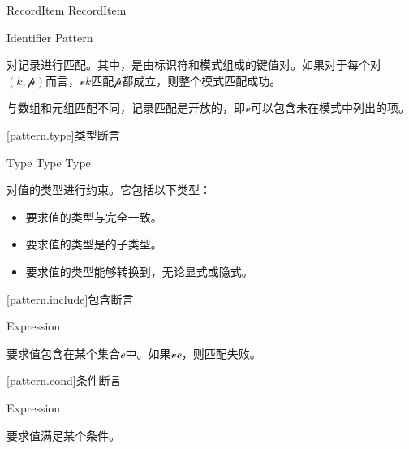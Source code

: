 \begin{bnf}
 \br
    RecordItem \bnflp\terminal{,} RecordItem\bnfrp\bnfs
\end{bnf}

\begin{bnf}
 \br
    Identifier \terminal{:} Pattern
\end{bnf}

\pnum
{}对记录进行匹配。其中，是由标识符和模式组成的键值对。如果对于每个对$(k, \mathcal{p})$而言，$\mathcal{v}$$k$匹配$\mathcal{p}$都成立，则整个模式匹配成功。

\pnum
与数组和元组匹配不同，记录匹配是开放的，即$\mathcal{v}$可以包含未在模式中列出的项。

[pattern.type]{类型断言}

\begin{bnf}
 \br
     Type \br
    \terminal{:} Type \br
     Type
\end{bnf}

\pnum
{}对值的类型进行约束。它包括以下类型：

\begin{itemize}
    \item {}要求值的类型与完全一致。
    \item {}要求值的类型是的子类型。
    \item {}要求值的类型能够转换到，无论显式或隐式。
    \end{itemize}

[pattern.include]{包含断言}

\begin{bnf}
 \br
     Expression
\end{bnf}

\pnum
{}要求值包含在某个集合$\mathcal{e}$中。如果$\mathcal{v}$$\mathcal{e}$，则匹配失败。

[pattern.cond]{条件断言}

\begin{bnf}
 \br
     Expression
\end{bnf}

\pnum
{}要求值满足某个条件。